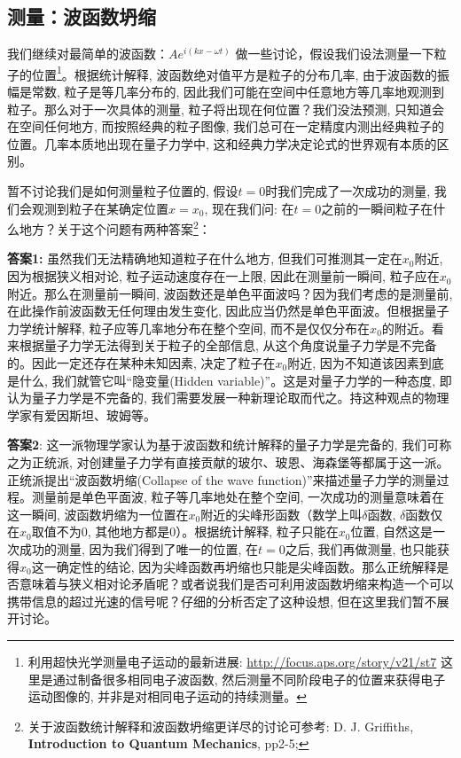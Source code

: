\subsection{测量：波函数坍缩}

我们继续对最简单的波函数：$Ae^{i\left( {kx - \omega t} \right)} $
做一些讨论，假设我们设法测量一下粒子的位置\footnote{利用超快光学测量电子运动的最新进展:
\url{http://focus.aps.org/story/v21/st7}
这里是通过制备很多相同电子波函数,
然后测量不同阶段电子的位置来获得电子运动图像的,
并非是对相同电子运动的持续测量。}。根据统计解释,
波函数绝对值平方是粒子的分布几率, 由于波函数的振幅是常数,
粒子是等几率分布的,
因此我们可能在空间中任意地方等几率地观测到粒子。那么对于一次具体的测量,
粒子将出现在何位置？我们没法预测, 只知道会在空间任何地方,
而按照经典的粒子图像,
我们总可在一定精度内测出经典粒子的位置。几率本质地出现在量子力学中,
这和经典力学决定论式的世界观有本质的区别。

暂不讨论我们是如何测量粒子位置的,
假设$t=0$时我们完成了一次成功的测量,
我们会观测到粒子在某确定位置$x=x_0$, 现在我们问:
在$t=0$之前的一瞬间粒子在什么地方？关于这个问题有两种答案\footnote{关于波函数统计解释和波函数坍缩更详尽的讨论可参考:
D. J. Griffiths, \textbf{Introduction to Quantum Mechanics},
pp2-5;}：


\textbf{答案1:} 虽然我们无法精确地知道粒子在什么地方,
但我们可推测其一定在$x_0$附近, 因为根据狭义相对论,
粒子运动速度存在一上限, 因此在测量前一瞬间,
粒子应在$x_0$附近。那么在测量前一瞬间,
波函数还是单色平面波吗？因为我们考虑的是测量前,
在此操作前波函数无任何理由发生变化,
因此应当仍然是单色平面波。但根据量子力学统计解释,
粒子应等几率地分布在整个空间,
而不是仅仅分布在$x_0$的附近。看来根据量子力学无法得到关于粒子的全部信息,
从这个角度说量子力学是不完备的。因此一定还存在某种未知因素,
决定了粒子在$x_0$附近, 因为不知道该因素到底是什么,
我们就管它叫``隐变量(Hidden variable)''。这是对量子力学的一种态度,
即认为量子力学是不完备的,
我们需要发展一种新理论取而代之。持这种观点的物理学家有爱因斯坦、玻姆等。

\textbf{答案2}:
这一派物理学家认为基于波函数和统计解释的量子力学是完备的,
我们可称之为正统派,
对创建量子力学有直接贡献的玻尔、玻恩、海森堡等都属于这一派。正统派提出``波函数坍缩(Collapse
of the wave function)''来描述量子力学的测量过程。测量前是单色平面波,
粒子等几率地处在整个空间, 一次成功的测量意味着在这一瞬间,
波函数坍缩为一位置在$x_0$附近的尖峰形函数（数学上叫$\delta$函数,
$\delta$函数仅在$x_0$取值不为$0$, 其他地方都是$0$）。根据统计解释,
粒子只能在$x_0$位置, 自然这是一次成功的测量,
因为我们得到了唯一的位置, 在$t=0$之后, 我们再做测量,
也只能获得$x_0$这一确定性的结论,
因为尖峰函数再坍缩也只能是尖峰函数。那么正统解释是否意味着与狭义相对论矛盾呢？或者说我们是否可利用波函数坍缩来构造一个可以携带信息的超过光速的信号呢？仔细的分析否定了这种设想,
但在这里我们暂不展开讨论。

